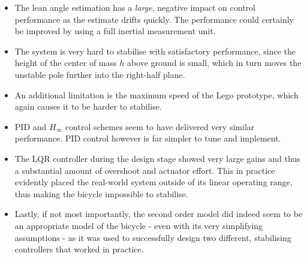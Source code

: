 \begin{itemize}
\item{The lean angle estimation has a \textit{large}, negative impact on control performance as the estimate drifts quickly. The performance could certainly be improved by using a full inertial measurement unit.}
\item{The system is very hard to stabilise with satisfactory performance, since the height of the center of mass $h$ above ground is small, which in turn moves the unstable pole further into the right-half plane.}
\item{An additional limitation is the maximum speed of the Lego prototype, which again causes it to be harder to stabilise.}
\item{PID and $H_{\infty}$ control schemes seem to have delivered very similar performance. PID control however is far simpler to tune and implement.}
\item{The LQR controller during the design stage showed very large gains and thus a substantial amount of overshoot and actuator effort. This in practice evidently placed the real-world system outside of its linear operating range, thus making the bicycle impossible to stabilise.}
\item{Lastly, if not most importantly, the second order model did indeed seem to be an appropriate model of the bicycle - even with its very simplifying assumptions - as it was used to successfully design two different, stabilising controllers that worked in practice.}
\end{itemize}